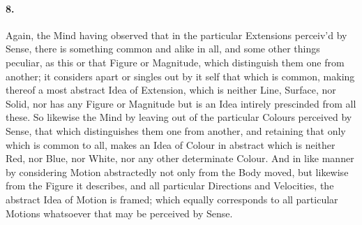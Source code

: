 \documentclass[]{article}
\newenvironment{sectionbody}{}{}
\begin{document}
\begin{sectionbody}
\paragraph{8.} Again, the Mind having observed that in the particular Extensions
perceiv'd by Sense, there is something common and alike in all,
and some other things peculiar, as this or that Figure or
Magnitude, which distinguish them one from another; it considers
apart or singles out by it self that which is common, making
thereof a most abstract Idea of Extension, which is neither Line,
Surface, nor Solid, nor has any Figure or Magnitude but is an
Idea intirely prescinded from all these.  So likewise the Mind by
leaving out of the particular Colours perceived by Sense, that
which distinguishes them one from another, and retaining that
only which is common to all, makes an Idea of Colour in abstract
which is neither Red, nor Blue, nor White, nor any other
determinate Colour.  And in like manner by considering Motion
abstractedly not only from the Body moved, but likewise from the
Figure it describes, and all particular Directions and
Velocities, the abstract Idea of Motion is framed; which equally
corresponds to all particular Motions whatsoever that may be
perceived by Sense.




\end{sectionbody}
\end{document}
